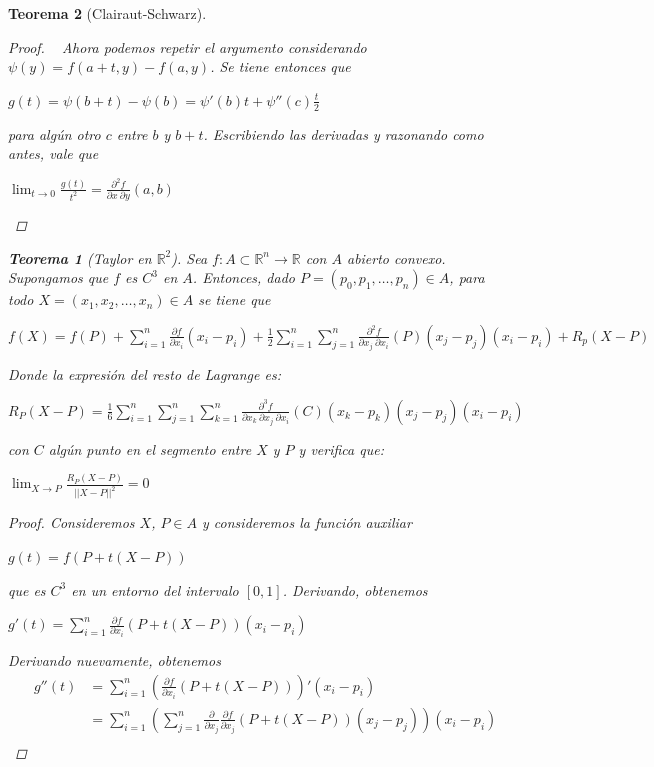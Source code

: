 \documentclass[]{article}
\newtheorem{teo}{Teorema}
\def\R{\mathbb{R}}
\newcommand{\dprim}[2]{\frac{\partial #1}{\partial #2}}
\newcommand{\dseg}[3]{\frac{\partial^2 #1}{\partial #2\ \partial #3}}
\newcommand{\dter}[4]{\frac{\partial^3 #1}{\partial #2\ \partial #3\ \partial #4}}
\newcommand{\zum}[2]{\sum_{#1}^{#2}}
\begin{document}
\begin{teo}[Clairaut-Schwarz]
\begin{proof}
		~\newline
		Ahora podemos repetir el argumento considerando $\psi(y) = f(a+t,y)-f(a,y)$. Se tiene entonces que
		\begin{center}
			$g(t) = \psi(b+t) - \psi(b) = \psi'(b)t + \psi''(c)\frac{t}{2}$
		\end{center}
		para algún otro $c$ entre $b$ y $b+t$. Escribiendo las derivadas y razonando como antes, vale que
		\begin{center}
			$\displaystyle \lim_{t\to 0}\frac{g(t)}{t^2} = \dseg{f}{x}{y}(a,b)$
		\end{center}
	\end{proof}
	
	\begin{teo}[Taylor en $\R^2$]
		Sea $f:A\subset\R^n\to\R$ con $A$ abierto convexo. Supongamos que $f$ es $C^3$ en $A$. Entonces, dado $P=(p_0,p_1,\hdots,p_n)\in A$, para todo $X=(x_1,x_2,\hdots,x_n)\in A$ se tiene que
		\begin{center}
			$\displaystyle f(X) = f(P) + \sum_{i=1}^{n}\dprim{f}{x_i}(x_i-p_i) + \frac{1}{2}\sum_{i=1}^n\sum_{j=1}^n\dseg{f}{x_j}{x_i}(P)(x_j-p_j)(x_i-p_i) + R_p(X-P)$
		\end{center}
		Donde la expresión del resto de Lagrange es:
		\begin{center}
			$\displaystyle R_P(X-P) = \frac{1}{6}\sum_{i=1}^{n}\sum_{j=1}^{n}\sum_{k=1}^{n}\dter{f}{x_k}{x_j}{x_i}(C)(x_k-p_k)(x_j-p_j)(x_i-p_i)$
		\end{center}
		con $C$ algún punto en el segmento entre $X$ y $P$ y verifica que:
		\begin{center}
			$\displaystyle \lim_{X\to P}\frac{R_P(X-P)}{||X-P||^2}=0$
		\end{center}
		\begin{proof}
			Consideremos $X$, $P\in A$ y consideremos la función auxiliar
			\begin{center}
				$g(t) = f(P+t(X-P))$
			\end{center}
			que es $C^3$ en un entorno del intervalo $[0,1]$. Derivando, obtenemos
			\begin{center}
				$\displaystyle g'(t) = \sum_{i=1}^{n}\dprim{f}{x_i}(P+t(X-P))(x_i-p_i)$
			\end{center}
			Derivando nuevamente, obtenemos
			\begin{eqnarray*}
				& \displaystyle g''(t) & = \sum_{i=1}^{n}\left(\dprim{f}{x_i}(P+t(X-P))\right)'(x_i-p_i)\\
				& & = \displaystyle \zum{i=1}{n}\left(\zum{j=1}{n}\frac{\partial}{\partial x_j}\frac{\partial f}{\partial x_j}(P+t(X-P))(x_j-p_j)\right)(x_i-p_i)\\

\end{eqnarray*}
\end{proof}
\end{teo}
\end{teo}
\end{document}
